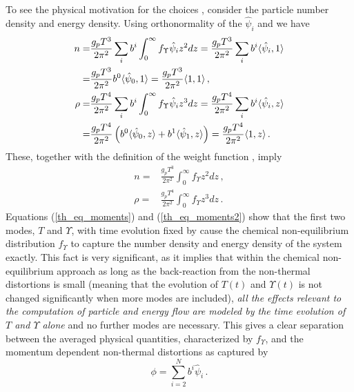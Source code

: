 To see the physical motivation for the choices , consider the particle number density and energy density.  Using orthonormality of the $\hat\psi_i$ and  we have
\begin{align}
n=&\frac{g_pT^3}{2\pi^2}\sum_ib^i\int_0^\infty f_\Upsilon  \hat\psi_i z^2 dz=\frac{g_pT^3}{2\pi^2}\sum_ib^i\langle \hat\psi_i ,1\rangle\\
=&\frac{g_pT^3}{2\pi^2}b^0\langle \hat\psi_0 ,1\rangle=\frac{g_pT^3}{2\pi^2}\langle 1 ,1\rangle\,,\notag\\
\rho=&\frac{g_pT^4}{2\pi^2}\sum_ib^i\int_0^\infty f_\Upsilon  \hat\psi_i z^3 dz=\frac{g_pT^4}{2\pi^2}\sum_ib^i\langle\hat\psi_i, z\rangle\\
=&\frac{g_pT^4}{2\pi^2}\left(b^0\langle\hat\psi_0, z\rangle+b^1\langle\hat\psi_1, z\rangle\right)=
\frac{g_pT^4}{2\pi^2}\langle 1,z\rangle\,.\notag
\end{align}
These, together with the definition of the weight function , imply
\begin{align}\label{th_eq_moments}
n=&\frac{g_pT^3}{2\pi^2}\int_0^\infty f_\Upsilon  z^2dz\,,\\
\label{th_eq_moments2}
\rho=&\frac{g_pT^4}{2\pi^2}\int_0^\infty f_\Upsilon  z^3dz\,.
\end{align}
Equations (\ref{th_eq_moments}) and (\ref{th_eq_moments2}) show  that the first two modes, $T$ and $\Upsilon$, with time evolution fixed by  cause the chemical non-equilibrium distribution $f_\Upsilon $ to capture the number density and energy density of the system exactly.  This fact is very significant, as it implies that within the chemical non-equilibrium approach as long as the back-reaction from the non-thermal distortions is small (meaning that the evolution of $T(t)$ and $\Upsilon(t)$ is not changed significantly when more modes are included), {\em all the effects relevant to the computation of  particle and energy flow are modeled by the time evolution of $T$ and $\Upsilon$ alone} and no further modes are necessary.  This gives a clear separation between the averaged physical quantities, characterized by $f_\Upsilon $, and the momentum dependent non-thermal distortions as captured by 
\begin{equation}
\phi=\sum_{i=2}^N b^i\hat\psi_i\,.
\end{equation}

